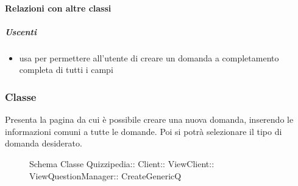 \paragraph{Relazioni con altre classi}
\subparagraph{Uscenti}
\begin{itemize}
\item usa  per permettere all'utente di creare un domanda a completamento completa di tutti i campi
\end{itemize}
\subsubsection{Classe }
Presenta la pagina da cui è possibile creare una nuova domanda, inserendo le informazioni comuni a tutte le domande. Poi si potrà selezionare il tipo di domanda desiderato.
\begin{figure}[H]
\centering
\noindent{}
\caption[Schema Classe CreateGenericQ]{Schema Classe Quizzipedia:: Client:: ViewClient:: ViewQuestionManager:: CreateGenericQ}
\end{figure}
